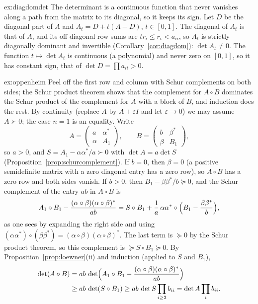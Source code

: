 \begin{solution}{ex:diagdomdet}
\idea The determinant is a continuous function that never vanishes along a path from the matrix to its diagonal, so it keeps its sign.
\writeup Let $D$ be the diagonal part of $A$ and $A_t=D+t(A-D)$, $t\in[0,1]$. The diagonal of $A_t$ is that of $A$, and its off-diagonal
row sums are $tr_i\le r_i<a_{ii}$, so $A_t$ is strictly diagonally dominant and invertible (Corollary~\ref{cor:diagdom}): $\det A_t\ne0$. The
function $t\mapsto\det A_t$ is continuous (a polynomial) and never zero on $[0,1]$, so it has constant sign, that of $\det D=\prod a_{ii}>0$.
\end{solution}

\begin{solution}{ex:oppenheim}
\idea Peel off the first row and column with Schur complements on both sides; the Schur product theorem shows that the complement
for $A\circ B$ dominates the Schur product of the complement for $A$ with a block of $B$, and induction does the rest.
\writeup By continuity (replace $A$ by $A+\varepsilon I$ and let $\varepsilon\to0$) we may assume $A\succ0$; the case $n=1$ is an equality.
Write
\[
A=\begin{pmatrix}a&\alpha^*\\\alpha&A_1\end{pmatrix},\qquad B=\begin{pmatrix}b&\beta^*\\\beta&B_1\end{pmatrix},
\]
so $a>0$, and $S=A_1-\alpha\alpha^*/a\succ0$ with $\det A=a\det S$ (Proposition~\ref{prop:schurcomplement}). If $b=0$, then $\beta=0$ (a
positive semidefinite matrix with a zero diagonal entry has a zero row), so $A\circ B$ has a zero row and both sides vanish. If $b>0$,
then $B_1-\beta\beta^*/b\succeq0$, and the Schur complement of the entry $ab$ in $A\circ B$ is
\[
A_1\circ B_1-\frac{(\alpha\circ\beta)(\alpha\circ\beta)^*}{ab}=S\circ B_1+\frac1a\,\alpha\alpha^*\circ\Bigl(B_1-\frac{\beta\beta^*}b\Bigr),
\]
as one sees by expanding the right side and using $(\alpha\alpha^*)\circ(\beta\beta^*)=(\alpha\circ\beta)(\alpha\circ\beta)^*$. The last term is
$\succeq0$ by the Schur product theorem, so this complement is $\succeq S\circ B_1\succeq0$. By Proposition~\ref{prop:loewner}(ii) and
induction (applied to $S$ and $B_1$),
\[
\begin{aligned}
\det(A\circ B)&=ab\,\det\Bigl(A_1\circ B_1-\frac{(\alpha\circ\beta)(\alpha\circ\beta)^*}{ab}\Bigr)\\
&\ge ab\,\det(S\circ B_1)\ge ab\,\det S\prod_{i\ge2}b_{ii}=\det A\prod_ib_{ii}.
\end{aligned}
\]
\end{solution}

